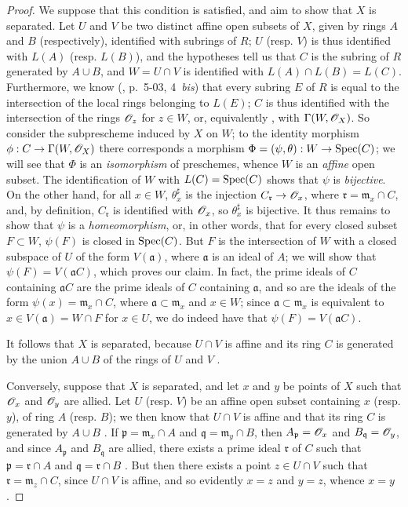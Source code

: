 \begin{proof}
We suppose that this condition is satisfied, and aim to show that $X$ is separated.
Let $U$ and $V$ be two distinct affine open subsets of $X$, given by rings $A$ and $B$ (respectively), identified with subrings of $R$;
$U$ (resp. $V$) is thus identified  with $L(A)$ (resp. $L(B)$), and the hypotheses tell us  that $C$ is the subring of $R$ generated by $A\cup B$, and $W=U\cap V$ is identified with $L(A)\cap L(B)=L(C)$.
Furthermore, we know (\cite{I-1}, p.~5-03, 4~\emph{bis}) that every subring $E$ of $R$ is equal to the intersection of the local rings belonging to $L(E)$;
$C$ is thus identified with the intersection of the rings $\mathscr{O}_z$ for $z\in W$, or, equivalently , with $\Gamma(W,\mathscr{O}_X)$.
So consider the subprescheme induced by $X$ on $W$;
to the identity morphism $\vphi: C\to\Gamma(W,\sh{O}_X)$ there corresponds  a morphism $\Phi=(\psi,\theta):W\to\Spec(C)$;
we will see that $\Phi$ is an \emph{isomorphism} of preschemes, whence $W$ is an \emph{affine} open subset.
The identification of $W$ with $L(C)=\operatorname{Spec}(C)$ shows that $\psi$ is \emph{bijective}.
On the other hand, for all $x\in W$, $\theta_x^\sharp$ is the injection $C_\mathfrak{r}\to\sh{O}_x$, where $\mathfrak{r}=\mathfrak{m}_x\cap C$, and, by definition, $C_\mathfrak{r}$ is identified with $\mathscr{O}_x$, so $\theta_x^\sharp$ is bijective.
It thus remains to show that $\psi$ is a \emph{homeomorphism}, or, in other words, that for every closed subset $F\subset W$, $\psi(F)$ is closed in
$\operatorname{Spec}(C)$.
But $F$ is the intersection of $W$ with a closed subspace of $U$ of the form $V(\mathfrak{a})$, where $\mathfrak{a}$ is an ideal of $A$;
we will show that $\psi(F)=V(\mathfrak{a}C)$, which proves our claim.
In fact, the prime ideals of $C$ containing $\mathfrak{a}C$ are the prime ideals of $C$ containing $\mathfrak{a}$, and so are the ideals of the form $\psi(x)=\mathfrak{m}_x\cap C$, where $\mathfrak{a}\subset\mathfrak{m}_x$ and $x\in W$;
since $\mathfrak{a}\subset\mathfrak{m}_x$ is equivalent to $x\in V(\mathfrak{a})=W\cap F$ for $x\in U$, we do indeed have that $\psi(F)=V(\mathfrak{a}C)$.

It follows that $X$ is separated, because $U\cap V$ is affine and its ring $C$ is generated by the union $A\cup B$ of the rings of $U$ and $V$ .

Conversely, suppose that $X$ is separated, and let $x$ and $y$ be points of $X$ such that $\mathscr{O}_x$ and $\mathscr{O}_y$ are allied.
Let $U$ (resp. $V$) be an affine open subset containing $x$ (resp. $y$), of ring $A$ (resp. $B$);
we then know that $U\cap V$ is affine and that its ring $C$ is generated by $A\cup B$ .
If $\mathfrak{p}=\mathfrak{m}_x\cap A$ and $\mathfrak{q}=\mathfrak{m}_y\cap B$, then $A_\mathfrak{p}=\mathscr{O}_x$ and $B_\mathfrak{q}=\mathscr{O}_y$, and since $A_\mathfrak{p}$ and $B_\mathfrak{q}$ are allied, there exists a prime ideal $\mathfrak{r}$ of $C$ such that $\mathfrak{p}=\mathfrak{r}\cap A$ and $\mathfrak{q}=\mathfrak{r}\cap B$ .
But then there exists a point $z\in U\cap V$ such that $\mathfrak{r}=\mathfrak{m}_z\cap C$, since $U\cap V$ is affine, and so evidently $x=z$ and $y=z$, whence $x=y$.
\end{proof}

